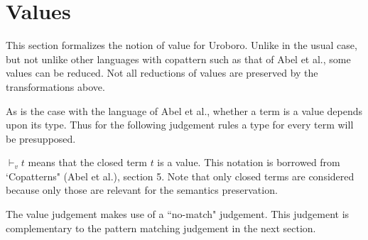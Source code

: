 \documentclass[11pt]{article} %
\begin{document}
\section{Values}

This section formalizes the notion of value for Uroboro. Unlike in the usual case, but not unlike other languages with copattern such as that of Abel et al., some values can be reduced. Not all reductions of values are preserved by the transformations above. 

As is the case with the language of Abel et al., whether a term is a value depends upon its type. Thus for the following judgement rules a type for every term will be presupposed.

$\vdash_v t$ means that the closed term $t$ is a value. This notation is borrowed from `Copatterns" (Abel et al.), section 5. Note that only closed terms are considered because only those are relevant for the semantics preservation.


The value judgement makes use of a ``no-match" judgement. This judgement is complementary to the pattern matching judgement in the next section.

\begin{prooftree}
\end{prooftree}

\begin{prooftree}
\end{prooftree}

\begin{prooftree}
\end{prooftree}

\begin{prooftree}
\end{prooftree}

\begin{prooftree}
\end{prooftree}
\end{document}
